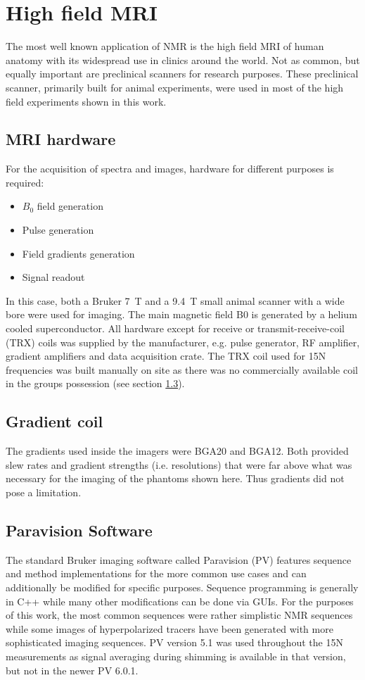     \section{High field MRI}
        The most well known application of NMR is the high field MRI of human anatomy with its widespread use in clinics around the world. Not as common, but equally important are preclinical scanners for research purposes. These preclinical scanner, primarily built for animal experiments, were used in most of the high field experiments shown in this work.  \subsection{MRI hardware}
            For the acquisition of spectra and images, hardware for different purposes is required:
            \begin{itemize}
            \item $B_0$ field generation
            \item Pulse generation
            \item Field gradients generation
            \item Signal readout
            \end{itemize}
            In this case, both a Bruker \SI{7}{\tesla} and a \SI{9.4}{\tesla} small animal scanner with a wide bore were used for imaging. The main magnetic field B0 is generated by a helium cooled superconductor. All hardware except for receive or transmit-receive-coil (TRX) coils was supplied by the manufacturer, e.g. pulse generator, RF amplifier, gradient amplifiers and data acquisition crate. The TRX coil used for 15N frequencies was built manually on site as there was no commercially available coil in the groups possession (see section \ref{}).
        \subsection{Gradient coil}
            The gradients used inside the imagers were BGA20 and BGA12. Both provided slew rates and gradient strengths (i.e. resolutions) that were far above what was necessary for the imaging of the phantoms shown here. Thus gradients did not pose a limitation.
        \subsection{Paravision Software}
        The standard Bruker imaging software called Paravision (PV) features sequence and method implementations for the more common use cases and can additionally be modified for specific purposes. Sequence programming is generally in C++ while many other modifications can be done via GUIs.  For the purposes of this work, the most common sequences were rather simplistic NMR sequences while some images of hyperpolarized tracers have been generated with more sophisticated imaging sequences. PV version 5.1 was used throughout the 15N measurements as signal averaging during shimming is available in that version, but not in the newer PV 6.0.1.
